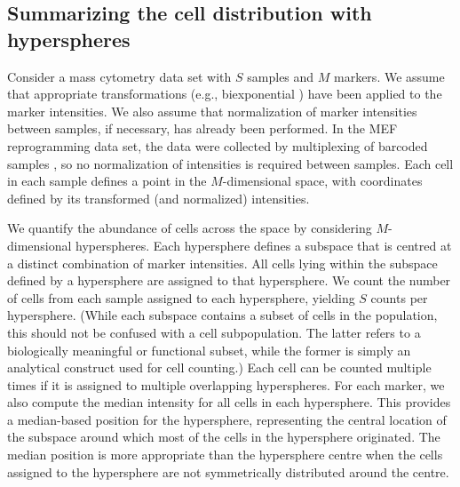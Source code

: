 \documentclass{article}
\begin{document}
\subsection{Summarizing the cell distribution with hyperspheres}
Consider a mass cytometry data set with $S$ samples and $M$ markers.
We assume that appropriate transformations (e.g., biexponential \cite{parks2006new}) have been applied to the marker intensities.
We also assume that normalization of marker intensities between samples, if necessary, has already been performed.
In the MEF reprogramming data set, the data were collected by multiplexing of barcoded samples \cite{zunder2015palladium}, so no normalization of intensities is required between samples.
Each cell in each sample defines a point in the $M$-dimensional space, with coordinates defined by its transformed (and normalized) intensities.

We quantify the abundance of cells across the space by considering $M$-dimensional hyperspheres.
Each hypersphere defines a subspace that is centred at a distinct combination of marker intensities.
All cells lying within the subspace defined by a hypersphere are assigned to that hypersphere.
We count the number of cells from each sample assigned to each hypersphere, yielding $S$ counts per hypersphere.
(While each subspace contains a subset of cells in the population, this should not be confused with a cell subpopulation.
The latter refers to a biologically meaningful or functional subset, while the former is simply an analytical construct used for cell counting.)
Each cell can be counted multiple times if it is assigned to multiple overlapping hyperspheres.
For each marker, we also compute the median intensity for all cells in each hypersphere.
This provides a median-based position for the hypersphere, representing the central location of the subspace around which most of the cells in the hypersphere originated.
The median position is more appropriate than the hypersphere centre when the cells assigned to the hypersphere are not symmetrically distributed around the centre.

\end{document}
